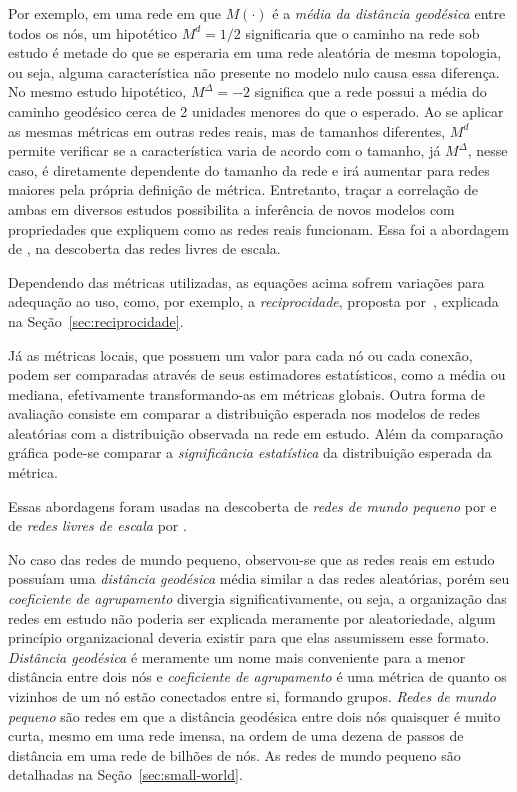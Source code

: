 \documentclass[12pt,a4paper]{article}
\theoremstyle{hypo}
\begin{document}
Por exemplo, em uma rede em que $M(\cdot)$ é a \textit{média da distância geodésica} entre todos os nós, um hipotético $M^d = 1/2$ significaria que o caminho na rede sob estudo é metade do que se esperaria em uma rede aleatória de mesma topologia, ou seja, alguma característica não presente no modelo nulo causa essa diferença. No mesmo estudo hipotético, $M^\Delta = -2$ significa que a rede possui a média do caminho geodésico cerca de 2 unidades menores do que o esperado. Ao se aplicar as mesmas métricas em outras redes reais, mas de tamanhos diferentes, $M^d$ permite verificar se a característica varia de acordo com o tamanho, já $M^\Delta$, nesse caso, é diretamente dependente do tamanho da rede e irá aumentar para redes maiores pela própria definição de métrica. Entretanto, traçar a correlação de ambas em diversos estudos possibilita a inferência de novos modelos com propriedades que expliquem como as redes reais funcionam. Essa foi a abordagem de \cite{Barabasi1999-sn}, na descoberta das redes livres de escala. 

Dependendo das métricas utilizadas, as equações acima sofrem variações para adequação ao uso, como, por exemplo, a \textit{reciprocidade}, proposta por~, explicada na Seção~\ref{sec:reciprocidade}.

Já as métricas locais, que possuem um valor para cada nó ou cada conexão, podem ser comparadas através de seus estimadores estatísticos, como a média ou mediana, efetivamente transformando-as em métricas globais. Outra forma de avaliação consiste em comparar a distribuição esperada nos modelos de redes aleatórias com a distribuição observada na rede em estudo. Além da comparação gráfica pode-se comparar a \textit{significância estatística} da distribuição esperada da métrica.


Essas abordagens foram usadas na descoberta de \textit{redes de mundo pequeno} por  e de \textit{redes livres de escala} por .

No caso das redes de mundo pequeno, observou-se que as redes reais em estudo possuíam uma \textit{distância geodésica} média similar a das redes aleatórias, porém seu \textit{coeficiente de agrupamento} divergia significativamente, ou seja, a organização das redes em estudo não poderia ser explicada meramente por aleatoriedade, algum princípio organizacional deveria existir para que elas assumissem esse formato. \textit{Distância geodésica} é meramente um nome mais conveniente para a menor distância entre dois nós e \textit{coeficiente de agrupamento} é uma métrica de quanto os vizinhos de um nó estão conectados entre si, formando grupos. \textit{Redes de mundo pequeno} são redes em que a distância geodésica entre dois nós quaisquer é muito curta, mesmo em uma rede imensa, na ordem de uma dezena de passos de distância em uma rede de bilhões de nós. As redes de mundo pequeno são detalhadas na Seção~\ref{sec:small-world}. 
\end{document}
